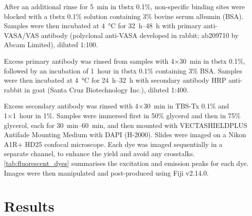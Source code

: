 After an additional rinse for \qty{5}{\minute} in \gls{tbstx} 0.1\%, non-specific binding sites were blocked with a \gls{tbstx} 0.1\% solution containing 3\% bovine serum albumin (BSA). Samples were then incubated at \qty{4}{\degreeCelsius} for \qtyrange{32}{48}{\hour} with primary anti-VASA/VAS antibody (polyclonal anti-VASA developed in rabbit; ab209710 by Abcam Limited), diluted 1:100.

Excess primary antibody was rinsed from samples with 4×\qty{30}{\minute} in \gls{tbstx} 0.1\%, followed by an incubation of \qty{1}{hour} in \gls{tbstx} 0.1\% containing 3\% BSA. Samples were then incubated at \qty{+4}{\degreeCelsius} for \qtyrange{24}{32}{\hour} with secondary antibody HRP anti-rabbit in goat (Santa Cruz Biotechnology Inc.), diluted 1:400.

Excess secondary antibody was rinsed with 4×\qty{30}{\minute} in TBS-Tx 0.1\% and 1×\qty{1}{hour} in  1\%. Samples were immersed first in 50\% glycerol and then in 75\% glycerol, each for \qtyrange{30}{60}{\minute}, and then mounted with VECTASHIELD\textregistered PLUS Antifade Mounting Medium with DAPI (H-2000). Slides were imaged on a Nikon A1R+ HD25 confocal microscope. Each dye was imaged sequentially in a separate channel, to enhance the yield and avoid any crosstalks. \cref{tab:fluorescent_dyes} summarises the excitation and emission peaks for each dye. Images were then manipulated and post-produced using Fiji v2.14.0.

\section{Results} \label{chapter:insitu-results}
